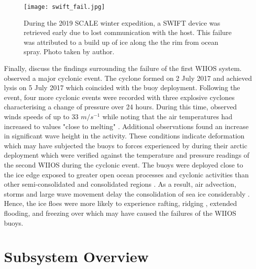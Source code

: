 \begin{figure}[H]
	\centering
	\texttt{[image: swift\_fail.jpg]}
	\caption{During the 2019 SCALE winter expedition, a SWIFT device was retrieved early due to lost communication with the host. This failure was attributed to a build up of ice along the the rim from ocean spray. Photo taken by author.}
	\label{fig:swift_fail}
\end{figure}

Finally, \textcite{vichi2019effects} discuss the findings surrounding the failure of the first WIIOS system. \textcite{vichi2019effects} observed a major cyclonic event. The cyclone formed on  2 July 2017 and achieved lysis on 5 July 2017 which coincided with the buoy deployment. Following the event, four more cyclonic events were recorded with three explosive cyclones \cite{vichi2019effects} characterising a change of pressure over 24 hours. During this time, \textcite{vichi2019effects} observed winds speeds of up to $33$ $m/s^{-1}$ while noting that the air temperatures had increased to values "close to melting" \cite{vichi2019effects}. Additional observations found an increase in significant wave height in the activity. These conditions indicate deformation \cite{vichi2019effects} which may have subjected the buoys to forces experienced by \cite{doble2017robust} during their arctic deployment which were verified against the temperature and pressure readings of the second WIIOS during the cyclonic event. The buoys were deployed close to the ice edge exposed to greater open ocean processes and cyclonic activities than other semi-consolidated and consolidated regions \cite{vichi2019effects}. As a result, air advection, storms and large wave movement delay the consolidation of sea ice considerably \cite{vichi2019effects}. Hence, the ice floes were more likely to experience rafting, ridging \cite{icedefinition1992}, extended flooding, and freezing over which may have caused the failures of the WIIOS buoys.
\newpage
\section{Subsystem Overview}

